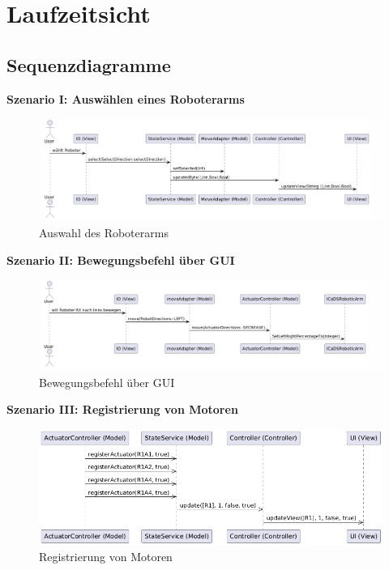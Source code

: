 
\chapter{Laufzeitsicht}

\section{Sequenzdiagramme}
\textbf{Szenario I: Auswählen eines Roboterarms}\\

\begin{figure}[h]
    \centering
    \includegraphics[width=0.8\linewidth]{diagrams/selectRobot_140725.png}
    \caption{Auswahl des Roboterarms}
    \label{fig:Auswahl}
\end{figure}

\clearpage\textbf{Szenario II: Bewegungsbefehl über GUI}\\

\begin{figure}[h]  
    \centering
    \includegraphics[width=0.8\linewidth]{diagrams/moveBefehl250625.png}
    \caption{Bewegungsbefehl über GUI}
    \label{fig:Bewegungsbefehl}
\end{figure}

\clearpage\textbf{Szenario III: Registrierung von Motoren}\\

\begin{figure}[h]  
    \centering
    \includegraphics[width=0.8\linewidth]{diagrams/register_16_7.png}
    \caption{Registrierung von Motoren}
    \label{fig:Registrierung}
\end{figure}




